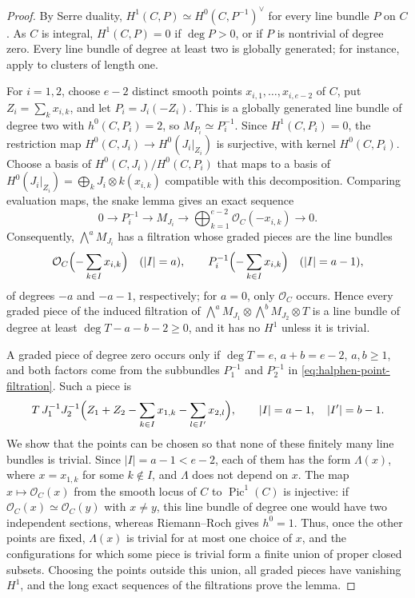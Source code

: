 \documentclass[11pt,reqno]{amsart}
\numberwithin{equation}{section}
\theoremstyle{remark}
\newcommand{\sshf}[1]{\mathcal{O}_{#1}}
\newcommand{\Pic}{\operatorname{Pic}}
\begin{document}
\begin{proof}
By Serre duality, \(H^1(C,P)\simeq H^0(C,P^{-1})^\vee\) for every line bundle \(P\) on \(C\). As \(C\) is integral, \(H^1(C,P)=0\) if \(\deg P>0\), or if \(P\) is nontrivial of degree zero. Every line bundle of degree at least two is globally generated; for instance, apply \cite[Theorem 1.1]{CFHR} to clusters of length one.

For \(i=1,2\), choose \(e-2\) distinct smooth points \(x_{i,1},\ldots,x_{i,e-2}\) of \(C\), put \(Z_i=\sum_kx_{i,k}\), and let \(P_i=J_i(-Z_i)\). This is a globally generated line bundle of degree two with \(h^0(C,P_i)=2\), so \(M_{P_i}\simeq P_i^{-1}\). Since \(H^1(C,P_i)=0\), the restriction map \(H^0(C,J_i)\to H^0(J_i|_{Z_i})\) is surjective, with kernel \(H^0(C,P_i)\). Choose a basis of \(H^0(C,J_i)/H^0(C,P_i)\) that maps to a basis of \(H^0(J_i|_{Z_i})=\bigoplus_kJ_i\otimes k(x_{i,k})\) compatible with this decomposition. Comparing evaluation maps, the snake lemma gives an exact sequence
\begin{equation}\label{eq:halphen-point-filtration}
 0\longrightarrow P_i^{-1}\longrightarrow M_{J_i}
 \longrightarrow\bigoplus_{k=1}^{e-2}\sshf{C}(-x_{i,k})\longrightarrow0.
\end{equation}
Consequently, \(\bigwedge^aM_{J_i}\) has a filtration whose graded pieces are the line bundles
\[
 \sshf{C}\Bigl(-\sum_{k\in I}x_{i,k}\Bigr)\quad(|I|=a),\qquad
 P_i^{-1}\Bigl(-\sum_{k\in I}x_{i,k}\Bigr)\quad(|I|=a-1),
\]
of degrees \(-a\) and \(-a-1\), respectively; for \(a=0\), only \(\sshf{C}\) occurs. Hence every graded piece of the induced filtration of \(\bigwedge^aM_{J_1}\otimes\bigwedge^bM_{J_2}\otimes T\) is a line bundle of degree at least \(\deg T-a-b-2\geq0\), and it has no \(H^1\) unless it is trivial.

A graded piece of degree zero occurs only if \(\deg T=e\), \(a+b=e-2\), \(a,b\geq1\), and both factors come from the subbundles \(P_1^{-1}\) and \(P_2^{-1}\) in \eqref{eq:halphen-point-filtration}. Such a piece is
\[
 T\,J_1^{-1}J_2^{-1}\Bigl(Z_1+Z_2-\sum_{k\in I}x_{1,k}-\sum_{l\in I'}x_{2,l}\Bigr),
 \qquad |I|=a-1,\quad |I'|=b-1.
\]
We show that the points can be chosen so that none of these finitely many line bundles is trivial. Since \(|I|=a-1<e-2\), each of them has the form \(\Lambda(x)\), where \(x=x_{1,k}\) for some \(k\notin I\), and \(\Lambda\) does not depend on \(x\). The map \(x\mapsto\sshf{C}(x)\) from the smooth locus of \(C\) to \(\Pic^1(C)\) is injective: if \(\sshf{C}(x)\simeq\sshf{C}(y)\) with \(x\neq y\), this line bundle of degree one would have two independent sections, whereas Riemann--Roch gives \(h^0=1\). Thus, once the other points are fixed, \(\Lambda(x)\) is trivial for at most one choice of \(x\), and the configurations for which some piece is trivial form a finite union of proper closed subsets. Choosing the points outside this union, all graded pieces have vanishing \(H^1\), and the long exact sequences of the filtrations prove the lemma.
\end{proof}
\end{document}

